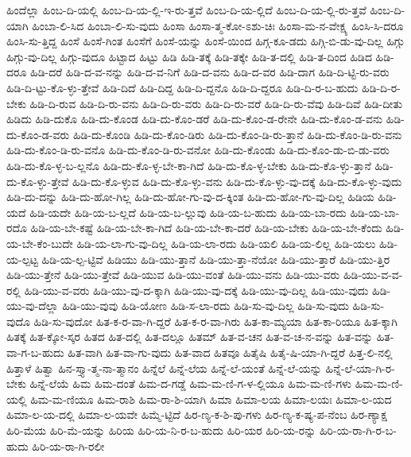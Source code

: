 {ಹಿಂದೆಲ್ಲಾ
ಹಿಂಬ-ದಿ-ಯಲ್ಲಿ
ಹಿಂಬ-ದಿ-ಯ-ಲ್ಲಿ-ಇ-ರು-ತ್ತವೆ
ಹಿಂಬ-ದಿ-ಯ-ಲ್ಲಿದೆ
ಹಿಂಬ-ದಿ-ಯ-ಲ್ಲಿ-ರು-ತ್ತವೆ
ಹಿಂಬ-ದಿ-ಯಾಗಿ
ಹಿಂಬಾ-ಲಿ-ಸಿದ
ಹಿಂಬಾ-ಲಿ-ಸು-ವುದು
ಹಿಂಸಾ
ಹಿಂಸಾ-ತ್ಮ-ಕೋ-ಽಶು-ಚಿಃ
ಹಿಂಸಾ-ಮ-ನ-ವೇಕ್ಷ್ಯ
ಹಿಂಸಿ-ಸಿ-ದರೂ
ಹಿಂಸಿ-ಸು-ತ್ತಿದ್ದ
ಹಿಂಸೆ
ಹಿಂಸೆ-ಗಿಂತ
ಹಿಂಸೆಗೆ
ಹಿಂಸೆ-ಯನ್ನು
ಹಿಂಸೆ-ಯಿಂದ
ಹಿಗ್ಗ-ಕೂ-ಡದು
ಹಿಗ್ಗಿ-ಬಿ-ಡು-ವು-ದಿಲ್ಲ
ಹಿಗ್ಗು
ಹಿಗ್ಗು-ವು-ದಿಲ್ಲ
ಹಿಗ್ಗು-ವುದೂ
ಹಿಟ್ಟಾದ
ಹಿಟ್ಟು
ಹಿಡಿ
ಹಿಡಿ-ತಕ್ಕೆ
ಹಿಡಿ-ತಕ್ಕೇ
ಹಿಡಿ-ತ-ದಲ್ಲಿ
ಹಿಡಿ-ತ-ದಿಂದ
ಹಿಡಿದ
ಹಿಡಿ-ದರೂ
ಹಿಡಿ-ದರೆ
ಹಿಡಿ-ದ-ವ-ನನ್ನು
ಹಿಡಿ-ದ-ವ-ನಿಗೆ
ಹಿಡಿ-ದ-ವನು
ಹಿಡಿ-ದ-ವರ
ಹಿಡಿ-ದಾಗ
ಹಿಡಿ-ದಿ-ಟ್ಟಿ-ರು-ವರು
ಹಿಡಿ-ದಿ-ಟ್ಟು-ಕೊ-ಳ್ಳು-ತ್ತೇವೆ
ಹಿಡಿ-ದಿದೆ
ಹಿಡಿ-ದಿದ್ದ
ಹಿಡಿ-ದಿ-ದ್ದನೊ
ಹಿಡಿ-ದಿ-ದ್ದರೂ
ಹಿಡಿ-ದಿ-ರ-ಬ-ಹುದು
ಹಿಡಿ-ದಿ-ರ-ಬೇಕು
ಹಿಡಿ-ದಿ-ರುವ
ಹಿಡಿ-ದಿ-ರು-ವನು
ಹಿಡಿ-ದಿ-ರು-ವರು
ಹಿಡಿ-ದಿ-ರು-ವರೆ
ಹಿಡಿ-ದಿ-ರು-ವೆವು
ಹಿಡಿ-ದಿವೆ
ಹಿಡಿ-ದೀತು
ಹಿಡಿದು
ಹಿಡಿ-ದುಕೊ
ಹಿಡಿ-ದು-ಕೊಂಡ
ಹಿಡಿ-ದು-ಕೊಂ-ಡರೆ
ಹಿಡಿ-ದು-ಕೊಂ-ಡ-ರೇನೇ
ಹಿಡಿ-ದು-ಕೊಂ-ಡ-ವನು
ಹಿಡಿ-ದು-ಕೊಂ-ಡ-ವರು
ಹಿಡಿ-ದು-ಕೊಂಡಿ
ಹಿಡಿ-ದು-ಕೊಂ-ಡಿರು
ಹಿಡಿ-ದು-ಕೊಂ-ಡಿ-ರು-ತ್ತಾನೆ
ಹಿಡಿ-ದು-ಕೊಂ-ಡಿ-ರು-ವನು
ಹಿಡಿ-ದು-ಕೊಂ-ಡಿ-ರು-ವನೊ
ಹಿಡಿ-ದು-ಕೊಂ-ಡಿ-ರು-ವನೋ
ಹಿಡಿ-ದು-ಕೊಂಡು
ಹಿಡಿ-ದು-ಕೊಂ-ಡು-ಬಿ-ಡು-ವರು
ಹಿಡಿ-ದು-ಕೊ-ಳ್ಳ-ಬ-ಲ್ಲನೊ
ಹಿಡಿ-ದು-ಕೊ-ಳ್ಳ-ಬೇ-ಕಾ-ಗಿದೆ
ಹಿಡಿ-ದು-ಕೊ-ಳ್ಳ-ಬೇಕು
ಹಿಡಿ-ದು-ಕೊ-ಳ್ಳು-ತ್ತಾನೆ
ಹಿಡಿ-ದು-ಕೊ-ಳ್ಳು-ತ್ತೇವೆ
ಹಿಡಿ-ದು-ಕೊ-ಳ್ಳುವ
ಹಿಡಿ-ದು-ಕೊ-ಳ್ಳು-ವನು
ಹಿಡಿ-ದು-ಕೊ-ಳ್ಳು-ವು-ದಕ್ಕೆ
ಹಿಡಿ-ದು-ಕೊ-ಳ್ಳು-ವುದು
ಹಿಡಿ-ದು-ದನ್ನು
ಹಿಡಿ-ದು-ಹೋ-ಗಿಲ್ಲ
ಹಿಡಿ-ದು-ಹೋ-ಗು-ವು-ದ-ಕ್ಕಿಂತ
ಹಿಡಿ-ದು-ಹೋ-ಗು-ವು-ದಿಲ್ಲ
ಹಿಡಿಯ
ಹಿಡಿ-ಯದೆ
ಹಿಡಿ-ಯದೇ
ಹಿಡಿ-ಯ-ಬ-ಲ್ಲದೆ
ಹಿಡಿ-ಯ-ಬ-ಲ್ಲುವು
ಹಿಡಿ-ಯ-ಬ-ಹುದು
ಹಿಡಿ-ಯ-ಬಾ-ರದು
ಹಿಡಿ-ಯ-ಬಾ-ರದೊ
ಹಿಡಿ-ಯ-ಬೇ-ಕಷ್ಟೆ
ಹಿಡಿ-ಯ-ಬೇ-ಕಾ-ಗಿದೆ
ಹಿಡಿ-ಯ-ಬೇ-ಕಾ-ದರೆ
ಹಿಡಿ-ಯ-ಬೇಕು
ಹಿಡಿ-ಯ-ಬೇ-ಕೆಂದು
ಹಿಡಿ-ಯ-ಬೇ-ಕೆಂ-ಬುದೇ
ಹಿಡಿ-ಯ-ಲಾ-ಗು-ವು-ದಿಲ್ಲ
ಹಿಡಿ-ಯ-ಲಾ-ರದು
ಹಿಡಿ-ಯಲಿ
ಹಿಡಿ-ಯ-ಲಿಲ್ಲ
ಹಿಡಿ-ಯಲು
ಹಿಡಿ-ಯ-ಲ್ಪಟ್ಟ
ಹಿಡಿ-ಯ-ಲ್ಪ-ಟ್ಟಿವೆ
ಹಿಡಿಯು
ಹಿಡಿ-ಯು-ತ್ತಾನೆ
ಹಿಡಿ-ಯು-ತ್ತಾ-ನೆಯೋ
ಹಿಡಿ-ಯು-ತ್ತಾರೆ
ಹಿಡಿ-ಯು-ತ್ತಿರ
ಹಿಡಿ-ಯು-ತ್ತೇನೆ
ಹಿಡಿ-ಯು-ತ್ತೇವೆ
ಹಿಡಿ-ಯುವ
ಹಿಡಿ-ಯು-ವಂತೆ
ಹಿಡಿ-ಯು-ವನು
ಹಿಡಿ-ಯು-ವರು
ಹಿಡಿ-ಯು-ವ-ವ-ರಲ್ಲಿ
ಹಿಡಿ-ಯು-ವ-ವರು
ಹಿಡಿ-ಯು-ವು-ದ-ಕ್ಕಾಗಿ
ಹಿಡಿ-ಯು-ವು-ದಕ್ಕೆ
ಹಿಡಿ-ಯು-ವು-ದಿಲ್ಲ
ಹಿಡಿ-ಯು-ವುದು
ಹಿಡಿ-ಯು-ವು-ದೆಲ್ಲಾ
ಹಿಡಿ-ಯು-ವುವು
ಹಿಡಿ-ಯೋಣ
ಹಿಡಿ-ಸ-ಲಾ-ರದು
ಹಿಡಿ-ಸು-ವು-ದಿಲ್ಲ
ಹಿಡಿ-ಸು-ವುದು
ಹಿಡಿ-ಸು-ವುದೊ
ಹಿಡಿ-ಸು-ವುದೋ
ಹಿತ-ಕ-ರ-ವಾ-ಗಿ-ದ್ದರೆ
ಹಿತ-ಕ-ರ-ವಾ-ಗಿರು
ಹಿತ-ಕಾ-ಮ್ಯಯಾ
ಹಿತ-ಕಾ-ರಿಯೂ
ಹಿತ-ಕ್ಕಾಗಿ
ಹಿತಕ್ಕೆ
ಹಿತ-ಕ್ಕೋ-ಸ್ಕರ
ಹಿತದ
ಹಿತ-ದಲ್ಲಿ
ಹಿತ-ದಲ್ಲೂ
ಹಿತಮ್
ಹಿತ-ವ-ಚನ
ಹಿತ-ವ-ಚ-ನ-ವನ್ನು
ಹಿತ-ವನ್ನು
ಹಿತ-ವಾ-ಗ-ಬ-ಹುದು
ಹಿತ-ವಾಗಿ
ಹಿತ-ವಾ-ಗು-ವುದು
ಹಿತ-ವಾದ
ಹಿತವೂ
ಹಿತೈಷಿ
ಹಿತೈ-ಷಿ-ಯಾ-ಗಿ-ದ್ದರೆ
ಹಿತ್ತ-ಲಿ-ನಲ್ಲಿ
ಹಿತ್ತಾಳೆ
ಹಿತ್ವಾ
ಹಿನ-ಸ್ತ್ಯಾ-ತ್ಮ-ನಾ-ತ್ಮಾನಂ
ಹಿನ್ನೆಲೆ
ಹಿನ್ನೆ-ಲೆಯ
ಹಿನ್ನೆ-ಲೆ-ಯಂತೆ
ಹಿನ್ನೆ-ಲೆ-ಯನ್ನು
ಹಿನ್ನೆ-ಲೆ-ಯಾ-ಗಿ-ರ-ಬೇಕು
ಹಿನ್ನೆ-ಲೆಯೆ
ಹಿಮ
ಹಿಮ-ದಂತೆ
ಹಿಮ-ದ-ಗಡ್ಡೆ
ಹಿಮ-ಮ-ಣಿ-ಗ-ಳ-ಲ್ಲಿಯೂ
ಹಿಮ-ಮ-ಣಿ-ಗಳು
ಹಿಮ-ಮ-ಣಿ-ಯಲ್ಲಿ
ಹಿಮ-ಮ-ಣಿಯೂ
ಹಿಮ-ರಾಶಿ
ಹಿಮ-ರಾ-ಶಿ-ಯಾಗಿ
ಹಿಮಾ
ಹಿಮಾ-ಲಯ
ಹಿಮಾ-ಲಯಃ
ಹಿಮಾ-ಲ-ಯದ
ಹಿಮಾ-ಲ-ಯ-ದಲ್ಲಿ
ಹಿಮಾ-ಲ-ಯವೇ
ಹಿಮ್ಮೆ-ಟ್ಟಿದೆ
ಹಿರ-ಣ್ಯ-ಕ-ಶಿ-ಪು-ಗಳು
ಹಿರ-ಣ್ಯ-ಕ-ಷ್ಯ-ಪ-ನೆಂಬ
ಹಿರ-ಣ್ಯಾಕ್ಷ
ಹಿರಿ-ಮೆಯ
ಹಿರಿ-ಮೆ-ಯನ್ನು
ಹಿರಿಯ
ಹಿರಿ-ಯ-ನಿ-ರ-ಬ-ಹುದು
ಹಿರಿ-ಯರ
ಹಿರಿ-ಯ-ರನ್ನು
ಹಿರಿ-ಯ-ರಾ-ಗಿ-ರ-ಬ-ಹುದು
ಹಿರಿ-ಯ-ರಾ-ಗಿ-ರಲೀ
}
